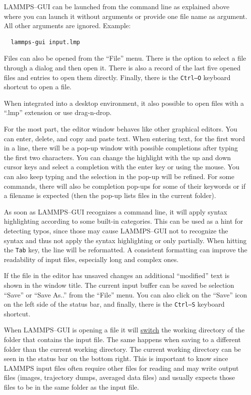 \documentclass[9pt,tutorial]{livecoms}
\renewcommand{\emph}[1]{\underline{#1}}
\begin{document}
\begin{appendices}
LAMMPS--GUI can be launched from the command line as explained above where you
can launch it without arguments or provide one file name as argument.  All
other arguments are ignored. Example:
{
\normalsize
\begin{verbatim}
  lammps-gui input.lmp
\end{verbatim}
}
Files can also be opened from the ``File'' menu.  There is the option
to select a file through a dialog and then open it.  There is also a
record of the last five opened files and entries to open them directly.
Finally, there is the \texttt{Ctrl--O} keyboard shortcut to open a file.

When integrated into a desktop environment, it also possible to open
files with a ``.lmp'' extension or use drag-n-drop.

For the most part, the editor window behaves like other graphical
editors.  You can enter, delete, and copy and paste text.  When entering
text, for the first word in a line, there will be a pop-up window with
possible completions after typing the first two characters. You can
change the highlight with the up and down cursor keys and select a
completion with the enter key or using the mouse.  You can also keep
typing and the selection in the pop-up will be refined.  For some
commands, there will also be completion pop-ups for some of their
keywords or if a filename is expected (then the pop-up lists files in
the current folder).

As soon as LAMMPS--GUI recognizes a command line, it will apply syntax
highlighting according to some built-in categories.  This can be used as
a hint for detecting typos, since those may cause LAMMPS--GUI not to
recognize the syntax and thus not apply the syntax highlighting or only
partially.  When hitting the \texttt{Tab} key, the line will be
reformatted.  A consistent formatting can improve the readability of
input files, especially long and complex ones.

If the file in the editor has unsaved changes an additional
``\*modified\*'' text is shown in the window title.  The current input
buffer can be saved be selection ``Save'' or ``Save As..'' from the
``File'' menu.  You can also click on the ``Save'' icon on the left side
of the status bar, and finally, there is the \texttt{Ctrl--S} keyboard
shortcut.


\begin{note}
When LAMMPS--GUI is opening a file it will \emph{switch} the working directory
of the folder that contains the input file.  The same happens when saving to
a different folder than the current working directory.  The current working
directory can be seen in the status bar on the bottom right.  This is important
to know since LAMMPS input files often require other files for reading and may
write output files (images, trajectory dumps, averaged data files) and usually
expects those files to be in the same folder as the input file.
\end{note}


\end{appendices}
\end{document}
